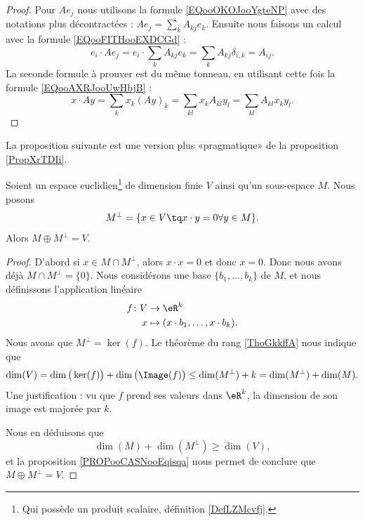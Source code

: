 \begin{proof}
	Pour \( Ae_j\) nous utilisons la formule \ref{EQooOKOJooYgteNP} avec des notations plus décontractées : \( Ae_j=\sum_kA_{kj}e_k\). Ensuite nous faisons un calcul avec la formule \eqref{EQooFITHooEXDCGd} :
	\begin{equation}
		e_i\cdot Ae_j=e_i\cdot \sum_kA_{kj}e_k=\sum_{k}A_{kj}\delta_{i,k}=A_{ij}.
	\end{equation}
	La seconde formule à prouver est du même tonneau, en utilisant cette fois la formule \eqref{EQooAXRJooUwHbjB} :
	\begin{equation}
		x\cdot Ay=\sum_kx_k(Ay)_k=\sum_{kl}x_kA_{kl}y_l=\sum_{kl}A_{kl}x_ky_l.
	\end{equation}
\end{proof}

La proposition suivante est une version plus «pragmatique» de la proposition \ref{PropXrTDIi}.
\begin{proposition}       \label{PROPooNITTooCYcrrT}
	Soient un espace euclidien\footnote{Qui possède un produit scalaire, définition \ref{DefLZMcvfj}.} de dimension finie \( V\) ainsi qu'un sous-espace \( M\). Nous posons
	\begin{equation}
		M^{\perp}=\{ x\in V\tq x\cdot y=0\forall y\in M \}.
	\end{equation}
	Alors \( M\oplus M^{\perp}=V\).
\end{proposition}

\begin{proof}
	D'abord si \( x\in M\cap M^{\perp}\), alors \( x\cdot x=0\) et donc \( x=0\). Donc nous avons déjà \( M\cap M^{\perp}=\{ 0 \}\). Nous considérons une base \( \{b_1,\ldots, b_k\}\) de \( M\), et nous définissons l'application linéaire
	\begin{equation}
		\begin{aligned}
			f\colon V & \to \eR^k                                \\
			x         & \mapsto (x\cdot b_1,\ldots, x\cdot b_k).
		\end{aligned}
	\end{equation}
	Nous avons que \( M^{\perp}=\ker(f)\). Le théorème du rang \ref{ThoGkkffA} nous indique que
	\begin{equation}
		\dim(V)=\dim\big( \ker(f) \big)+\dim\big( \Image(f) \big)\leq \dim(M^{\perp})+k=\dim(M^{\perp})+\dim(M).
	\end{equation}
	Une justification : vu que \( f\) prend ses valeurs dans \( \eR^k\), la dimension de son image est majorée par \( k\).

	Nous en déduisons que
	\begin{equation}
		\dim(M)+\dim(M^{\perp})\geq\dim(V),
	\end{equation}
	et la proposition \ref{PROPooCASNooEqisqa} nous permet de conclure que \( M\oplus M^{\perp}=V\).
\end{proof}


